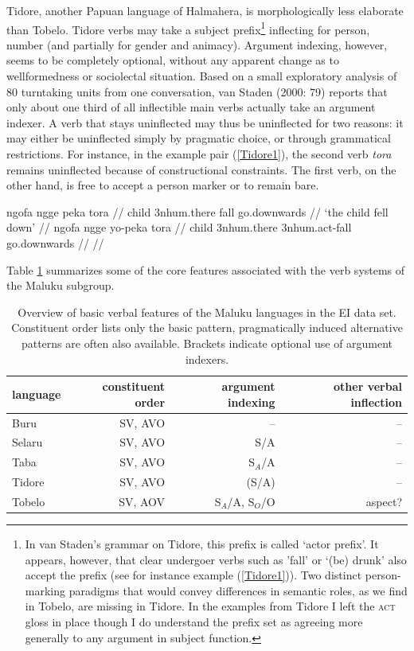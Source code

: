 Tidore, another Papuan language of Halmahera, is morphologically less elaborate than Tobelo. Tidore verbs may take a subject prefix\footnote{In van Staden's grammar on Tidore, this prefix is called `actor prefix'. It appears, however, that clear undergoer verbs such as 'fall' or `(be) drunk' also accept the prefix (see for instance example (\ref{Tidore1})). Two distinct person-marking paradigms that would convey differences in semantic roles, as we find in Tobelo, are missing in Tidore. In the examples from Tidore I left the \textsc{act} gloss in place though I do understand the prefix set as agreeing more generally to any argument in subject function.} inflecting for person, number (and partially for gender and animacy). Argument indexing, however, seems to be completely optional, without any apparent change as to wellformedness or sociolectal situation. Based on a small exploratory analysis of 80 turntaking units from one conversation, van Staden (2000: 79) reports that only about one third of all inflectible main verbs actually take an argument indexer. A verb that stays uninflected may thus be uninflected for two reasons: it may either be uninflected simply by pragmatic choice, or through grammatical restrictions. For instance, in the example pair (\ref{Tidore1}), the second verb \textit{tora} remains uninflected because of constructional constraints. The first verb, on the other hand, is free to accept a person marker or to remain bare.

\pex \label{Tidore1}
\a
\begingl
\gla ngofa ngge peka tora // 
\glb child 3\acs{nhum}.there fall go.downwards //
\glft `the child fell down’ // 
\endgl
\a
\begingl
\gla ngofa ngge yo-peka tora // 
\glb child 3\acs{nhum}.there 3\acs{nhum}.\acs{act}-fall go.downwards //
\glft  {}// 
\endgl
\xe

Table \ref{table:overviewmaluku} summarizes some of the core features associated with the verb systems of the Maluku subgroup.

\begin{table}[h]
\begin{center}
\begin{footnotesize}
\begin{tabular}{l r r r}
\hline\hline
language & constituent order & argument indexing & other verbal inflection \tabularnewline
\hline
Buru & SV, AVO & -- & -- \tabularnewline
Selaru & SV, AVO & S/A & -- \tabularnewline
Taba & SV, AVO & S$_A$/A & -- \tabularnewline
Tidore & SV, AVO & (S/A) & -- \tabularnewline
Tobelo & SV, AOV & S$_A$/A, S$_O$/O & aspect? \tabularnewline
\hline
\end{tabular}
\caption[Basic features of Maluku verb systems]{Overview of basic verbal features of the Maluku languages in the EI data set. Constituent order lists only the basic pattern, pragmatically induced alternative patterns are often also available. Brackets indicate optional use of argument indexers.}
\label{table:overviewmaluku}
\end{footnotesize}
\end{center}
\end{table}
\FloatBarrier


